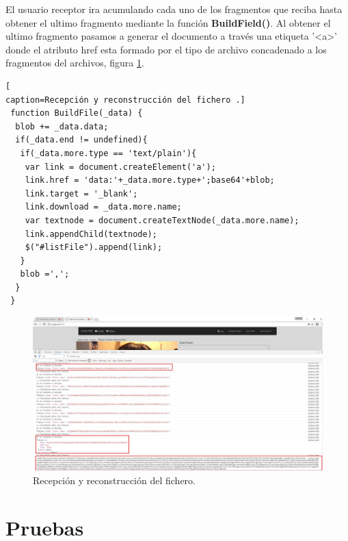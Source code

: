 El usuario receptor ira acumulando cada uno de los fragmentos que reciba hasta obtener el ultimo fragmento mediante la función \textbf{BuildField()}. Al obtener el ultimo fragmento pasamos a generar el documento a través una etiqueta '<a>' donde el atributo href esta formado por el tipo de archivo concadenado a los fragmentos del archivos, figura \ref{fig:FieldReceiveUser}.
\begin{lstlisting}[
caption=Recepción y reconstrucción del fichero .]
 function BuildFile(_data) {
  blob += _data.data;
  if(_data.end != undefined){
   if(_data.more.type == 'text/plain'){
    var link = document.createElement('a');
    link.href = 'data:'+_data.more.type+';base64'+blob;
    link.target = '_blank';
    link.download = _data.more.name;
    var textnode = document.createTextNode(_data.more.name);
    link.appendChild(textnode);
    $("#listFile").append(link);
   }
   blob =',';
  }
 }  
\end{lstlisting}
\begin{figure}[!h]
\centering
\includegraphics[width=0.8\linewidth]{Figures/filReceiveUser}
\decoRule
\caption[Recepción y reconstrucción del fichero]{Recepción y reconstrucción del fichero.}
\label{fig:FieldReceiveUser}
\end{figure}
\section{Pruebas}

